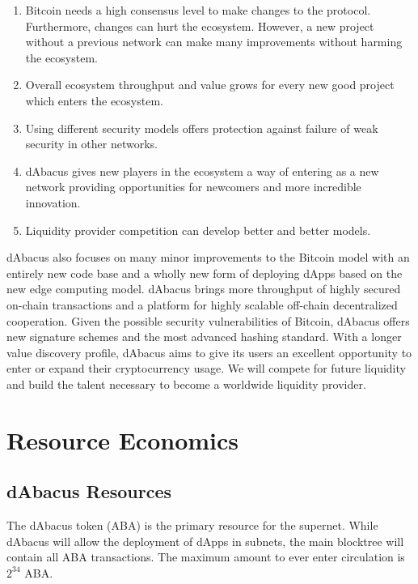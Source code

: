 \documentclass[12pt]{article}
\begin{document}
\begin{enumerate}

\item Bitcoin needs a high consensus level to make changes to the protocol. Furthermore, changes can hurt the ecosystem. However, a new project without a previous network can make many improvements without harming the ecosystem.

\item Overall ecosystem throughput and value grows for every new good project which enters the ecosystem. 

\item Using different security models offers protection against failure of weak security in other networks. 

\item dAbacus gives new players in the ecosystem a way of entering as a new network providing opportunities for newcomers and more incredible innovation. 

\item Liquidity provider competition can develop better and better models.

\end{enumerate}

dAbacus also focuses on many minor improvements to the Bitcoin model with an entirely new code base and a wholly new form of deploying dApps based on the new edge computing model. dAbacus brings more throughput of highly secured on-chain transactions and a platform for highly scalable off-chain decentralized cooperation. Given the possible security vulnerabilities of Bitcoin, dAbacus offers new signature schemes and the most advanced hashing standard. With a longer value discovery profile, dAbacus aims to give its users an excellent opportunity to enter or expand their cryptocurrency usage. We will compete for future liquidity and build the talent necessary to become a worldwide liquidity provider.





\section{Resource Economics}

\subsection{dAbacus Resources}

The dAbacus token (ABA) is the primary resource for the supernet. While dAbacus will allow the deployment of dApps in subnets, the main blocktree will contain all ABA transactions. The maximum amount to ever enter circulation is $2^{34}$ ABA.
\end{document}
